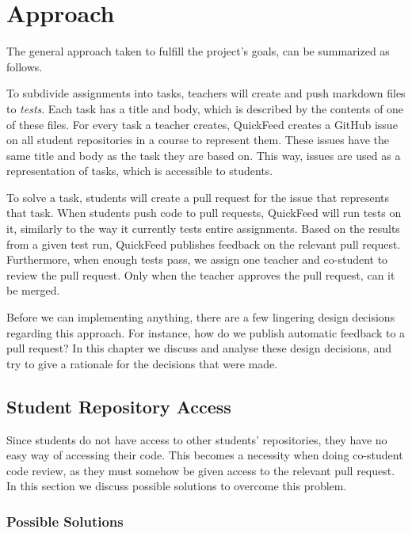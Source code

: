 
\chapter{Approach}
\label{ch:approach}

The general approach taken to fulfill the project's goals, can be summarized as follows.

To subdivide assignments into tasks, teachers will create and push markdown files to \textit{tests}.
Each task has a title and body, which is described by the contents of one of these files.
For every task a teacher creates, QuickFeed creates a GitHub issue on all student repositories in a course to represent them.
These issues have the same title and body as the task they are based on.
This way, issues are used as a representation of tasks, which is accessible to students.

To solve a task, students will create a pull request for the issue that represents that task.
When students push code to pull requests, QuickFeed will run tests on it, similarly to the way it currently tests entire assignments.
Based on the results from a given test run, QuickFeed publishes feedback on the relevant pull request.
Furthermore, when enough tests pass, we assign one teacher and co-student to review the pull request.
Only when the teacher approves the pull request, can it be merged.

Before we can implementing anything, there are a few lingering design decisions regarding this approach.
For instance, how do we publish automatic feedback to a pull request?
In this chapter we discuss and analyse these design decisions, and try to give a rationale for the decisions that were made.

\section{Student Repository Access}
\label{sec:student-repositoriy-access}

Since students do not have access to other students' repositories, they have no easy way of accessing their code.
This becomes a necessity when doing co-student code review, as they must somehow be given access to the relevant pull request.
In this section we discuss possible solutions to overcome this problem.

\subsection{Possible Solutions}

